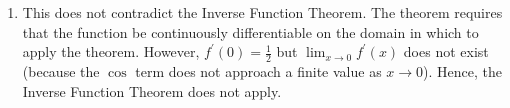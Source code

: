 \documentclass[letterpaper,11pt]{article}
\begin{document}
\begin{enumerate}
\begin{enumerate}
\begin{proof}
                    Because the derivative changes sign, this indicates a local
                    minimum or maximum in the function $f$. In a neighbourhood
                    of these extrema, the Intermediate Value Theorem guarantees
                    that we will have the same $y$ value to the left and to the
                    right of the extremum, because $f$ is continuous.
                    Therefore, $f$ is not invertible on any interval containing
                    the origin.
                \end{proof}

            \item
                This does not contradict the Inverse Function Theorem. The
                theorem requires that the function be continuously
                differentiable on the domain in which to apply the theorem.
                However, $f^\prime(0) = \frac{1}{2}$ but
                $\lim_{x \to 0} {f^\prime(x)}$ does not exist (because the
                $\cos{}$ term does not approach a finite value as $x \to 0$).
                Hence, the Inverse Function Theorem does not apply.
        \end{enumerate}
\end{enumerate}
\end{document}
